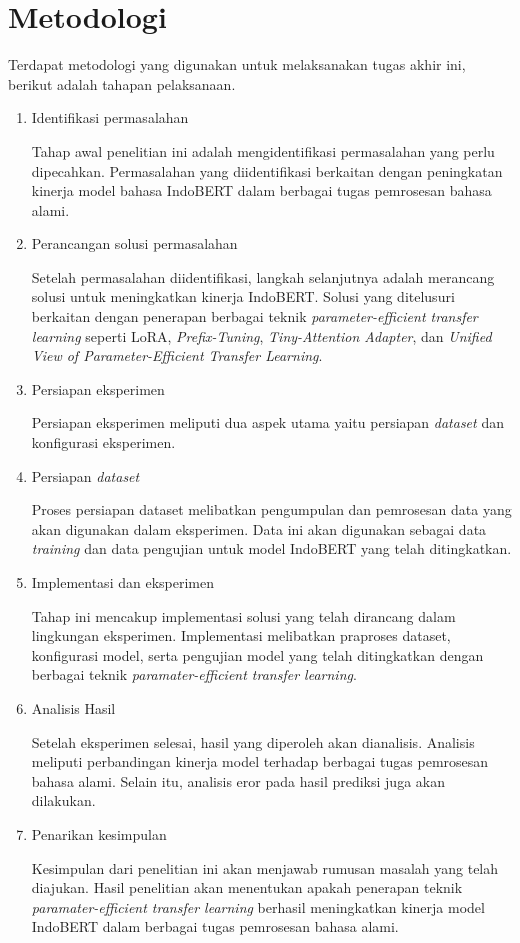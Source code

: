 \section{Metodologi}

Terdapat metodologi yang digunakan untuk melaksanakan tugas akhir ini, berikut adalah tahapan pelaksanaan.

\begin{enumerate}
    \item Identifikasi permasalahan
    
    Tahap awal penelitian ini adalah mengidentifikasi permasalahan yang perlu dipecahkan. Permasalahan yang diidentifikasi berkaitan dengan peningkatan kinerja model bahasa IndoBERT dalam berbagai tugas pemrosesan bahasa alami.

    \item Perancangan solusi permasalahan
    
    Setelah permasalahan diidentifikasi, langkah selanjutnya adalah merancang solusi untuk meningkatkan kinerja IndoBERT. Solusi yang ditelusuri berkaitan dengan penerapan berbagai teknik \textit{parameter-efficient transfer learning} seperti LoRA, \textit{Prefix-Tuning}, \textit{Tiny-Attention Adapter}, dan \textit{Unified View of Parameter-Efficient Transfer Learning}.

    \item Persiapan eksperimen
    
    Persiapan eksperimen meliputi dua aspek utama yaitu persiapan \textit{dataset} dan konfigurasi eksperimen.

    \item Persiapan \textit{dataset}
    
    Proses persiapan dataset melibatkan pengumpulan dan pemrosesan data yang akan digunakan dalam eksperimen. Data ini akan digunakan sebagai data \textit{training} dan data pengujian untuk model IndoBERT yang telah ditingkatkan.

    \item Implementasi dan eksperimen
    
    Tahap ini mencakup implementasi solusi yang telah dirancang dalam lingkungan eksperimen. Implementasi melibatkan praproses dataset, konfigurasi model, serta pengujian model yang telah ditingkatkan dengan berbagai teknik \textit{paramater-efficient transfer learning}.

    \item Analisis Hasil
    
    Setelah eksperimen selesai, hasil yang diperoleh akan dianalisis. Analisis meliputi perbandingan kinerja model terhadap berbagai tugas pemrosesan bahasa alami. Selain itu, analisis eror pada hasil prediksi juga akan dilakukan.

    \item Penarikan kesimpulan
    
    Kesimpulan dari penelitian ini akan menjawab rumusan masalah yang telah diajukan. Hasil penelitian akan menentukan apakah penerapan teknik \textit{paramater-efficient transfer learning} berhasil meningkatkan kinerja model IndoBERT dalam berbagai tugas pemrosesan bahasa alami.

\end{enumerate}